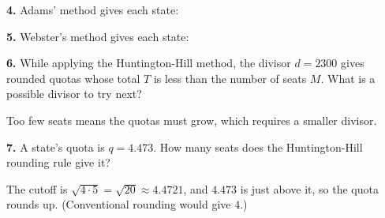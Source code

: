 \documentclass[12pt]{ximera}
\begin{document}
\begin{problem}
\begin{prompt}
\textbf{4.} Adams' method gives each state:
\begin{selectAll}
\end{selectAll}
\end{prompt}

\begin{prompt}
\textbf{5.} Webster's method gives each state:
\begin{selectAll}
\end{selectAll}
\end{prompt}
\end{problem}

\begin{problem}
\begin{prompt}
\textbf{6.} While applying the Huntington-Hill method, the divisor $d=2300$ gives rounded
quotas whose total $T$ is less than the number of seats $M$. What is a possible divisor to
try next?
\begin{multipleChoice}
\end{multipleChoice}
\begin{feedback}
Too few seats means the quotas must grow, which requires a smaller divisor.
\end{feedback}
\end{prompt}

\begin{prompt}
\textbf{7.} A state's quota is $q=4.473$. How many seats does the Huntington-Hill
rounding rule give it?
\begin{multipleChoice}
\end{multipleChoice}
\begin{feedback}
The cutoff is $\sqrt{4\cdot5}=\sqrt{20}\approx4.4721$, and $4.473$ is just above it, so the
quota rounds up. (Conventional rounding would give $4$.)
\end{feedback}
\end{prompt}
\end{problem}
\end{document}
